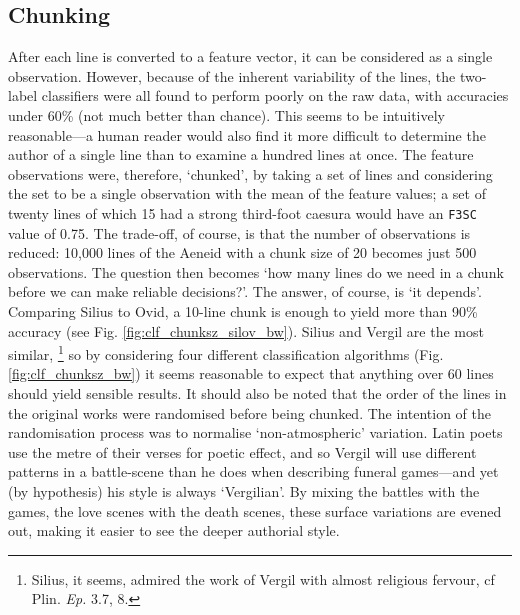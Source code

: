 \documentclass[11pt,a4paper]{scrartcl} %
\begin{document}
{\subsection{Chunking}

After each line is converted to a feature vector, it can be considered as a single observation. However, because of the inherent variability of the lines, the two-label classifiers were all found to perform poorly on the raw data, with accuracies under 60\% (not much better than chance). This seems to be intuitively reasonable---a human reader would also find it more difficult to determine the author of a single line than to examine a hundred lines at once. The feature observations were, therefore, `chunked', by taking a set of lines and considering the set to be a single observation with the mean of the feature values; a set of twenty lines of which 15 had a strong third-foot caesura would have an \texttt{F3SC} value of 0.75. The trade-off, of course, is that the number of observations is reduced: 10,000 lines of the Aeneid with a chunk size of 20 becomes just 500 observations. The question then becomes `how many lines do we need in a chunk before we can make reliable decisions?'. The answer, of course, is `it depends'. Comparing Silius to Ovid, a 10-line chunk is enough to yield more than 90\% accuracy (see Fig. \ref{fig:clf_chunksz_silov_bw}). Silius and Vergil are the most similar,%
\footnote{Silius, it seems, admired the work of Vergil with almost religious fervour, cf Plin. \textit{Ep.} 3.7, 8.}
so by considering four different classification algorithms (Fig. \ref{fig:clf_chunksz_bw}) it seems reasonable to expect that anything over 60 lines should yield sensible results. It should also be noted that the order of the lines in the original works were randomised before being chunked. The intention of the randomisation process was to normalise `non-atmospheric' variation. Latin poets use the metre of their verses for poetic effect, and so Vergil will use different patterns in a battle-scene than he does when describing funeral games---and yet (by hypothesis) his style is always `Vergilian'. By mixing the battles with the games, the love scenes with the death scenes, these surface variations are evened out, making it easier to see the deeper authorial style.

}
\end{document}
